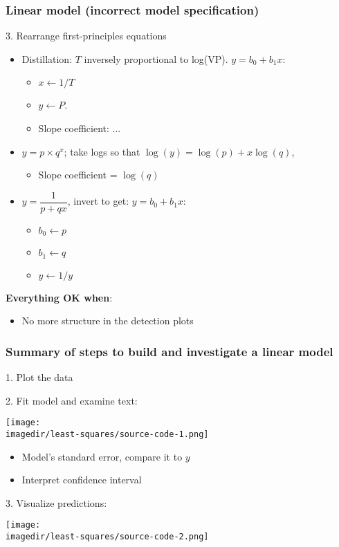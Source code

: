\begin{frame}\frametitle{Linear model (incorrect model specification)}

	3. Rearrange first-principles equations
	\begin{itemize}
		\item	Distillation: $T$ inversely proportional to log(VP). $y = b_0 + b_1x$:
		\begin{itemize}
			\item	$x \leftarrow 1/T$
			\item	$y \leftarrow P$.
			\item	Slope coefficient: ...
		\end{itemize}
		\item	$y = p \times q^x$; take logs so that $\log(y) = \log(p) + x \log(q)$,
		\begin{itemize}
			\item	Slope coefficient = $\log(q)$
		\end{itemize}
		\item	$y = \dfrac{1}{p+qx}$, invert to get: $y = b_0 + b_1 x$:
		\begin{itemize}
			\item	$b_0 \leftarrow p$
			\item	$b_1 \leftarrow q$
			\item	$y\leftarrow 1/y$
		\end{itemize}
	\end{itemize}

	\textbf{Everything OK when}:
	\begin{itemize}
		\item	No more structure in the detection plots
	\end{itemize}
\end{frame}

\begin{frame}\frametitle{Summary of steps to build and investigate a linear model}

	1. Plot the data

	2. Fit model and examine text:
	\begin{center}
		\texttt{[image: \\imagedir/least-squares/source-code-1.png]}
	\end{center}
	\begin{itemize}
		\item	Model's standard error, compare it to $y$
		\item	Interpret confidence interval
	\end{itemize}

	3. Visualize predictions:
	\begin{center}
		\texttt{[image: \\imagedir/least-squares/source-code-2.png]}
	\end{center}
\end{frame}

